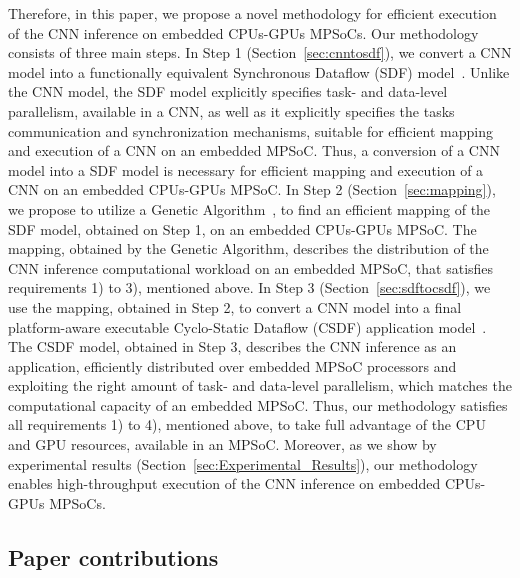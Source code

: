 Therefore, in this paper, we propose a novel methodology for efficient execution of the CNN inference on embedded CPUs-GPUs MPSoCs. Our methodology consists of three main steps. In Step 1 (Section~\ref{sec:cnntosdf}), we convert a CNN model into a functionally equivalent Synchronous  Dataflow (SDF) model~\cite{SDF}. Unlike the CNN model, the SDF model explicitly specifies task- and data-level parallelism, available in a CNN, as well as it explicitly specifies the tasks  communication and synchronization mechanisms,   suitable for efficient mapping and execution of a CNN on an  embedded MPSoC. Thus, a conversion of a CNN model into a SDF model is necessary for efficient mapping and execution of a CNN on an embedded CPUs-GPUs MPSoC. In Step 2 (Section~\ref{sec:mapping}), we propose to utilize a Genetic Algorithm~\cite{GA}, to find an efficient mapping of the SDF model, obtained on Step 1, on an  embedded CPUs-GPUs MPSoC. The mapping, obtained by the Genetic Algorithm, describes the distribution of the CNN inference  computational workload on an embedded MPSoC, that satisfies requirements 1) to 3), mentioned above. In Step 3 (Section~\ref{sec:sdftocsdf}), we use the mapping, obtained in Step 2, to convert a CNN model into a final platform-aware executable Cyclo-Static Dataflow (CSDF) application model~\cite{Bilsen96}. The CSDF model, obtained in Step 3, describes the CNN inference as an application, efficiently distributed over embedded MPSoC processors and exploiting the right amount of task- and data-level parallelism, which matches the  computational capacity of an embedded MPSoC. Thus, our methodology  satisfies all requirements 1) to 4), mentioned above, to take full advantage of the CPU and GPU resources, available in an MPSoC. Moreover, as we show by  experimental results (Section~\ref{sec:Experimental_Results}), our methodology enables high-throughput execution of the CNN inference on embedded CPUs-GPUs MPSoCs. 

\subsection*{Paper contributions}
\label{sec:contrib}

